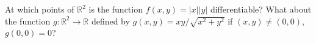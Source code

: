 At which points of $\mathbb R^2$ is the function $f(x,y)=|x||y|$ differentiable? What about the function $g:\mathbb R^2\to\mathbb R$ defined by $g(x,y)=xy/\sqrt{x^2+y^2}$ if $(x,y)\ne(0,0)$, $g(0,0)=0$?
